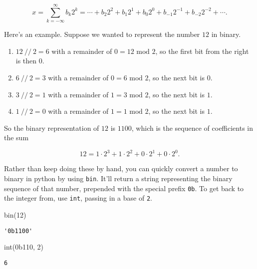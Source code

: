 \documentclass[
  letterpaper,
  DIV=11,
  numbers=noendperiod]{scrreprt}
\newenvironment{Shaded}{\begin{snugshade}}{\end{snugshade}}
\newcommand{\BuiltInTok}[1]{\textcolor[rgb]{0.00,0.23,0.31}{#1}}
\newcommand{\DecValTok}[1]{\textcolor[rgb]{0.68,0.00,0.00}{#1}}
\newcommand{\NormalTok}[1]{\textcolor[rgb]{0.00,0.23,0.31}{#1}}
\newcommand{\StringTok}[1]{\textcolor[rgb]{0.13,0.47,0.30}{#1}}
\providecommand{\tightlist}{%
  \setlength{\itemsep}{0pt}\setlength{\parskip}{0pt}}\usepackage{longtable,booktabs,array}
\begin{document}
\[x = \sum_{k=-\infty}^\infty b_k 2^k = \cdots + b_2 2^2 + b_1 2^1 + b_0 2^0 + b_{-1} 2^{-1} + b_{-2} 2^{-2} + \cdots.\]

Here's an example. Suppose we wanted to represent the number \(12\) in
binary.

\begin{enumerate}
\def\labelenumi{\arabic{enumi}.}
\tightlist
\item
  \(12 \ // \ 2 = 6\) with a remainder of \(0 = 12 \text{ mod } 2\), so
  the first bit from the right is then \(0\).
\item
  \(6 \ // \ 2 = 3\) with a remainder of \(0 = 6 \text{ mod } 2\), so
  the next bit is \(0\).
\item
  \(3 \ // \ 2 = 1\) with a remainder of \(1 = 3 \text{ mod } 2\), so
  the next bit is \(1\).
\item
  \(1 \ // \ 2 = 0\) with a remainder of \(1 = 1 \text{ mod } 2\), so
  the next bit is \(1\).
\end{enumerate}

So the binary representation of \(12\) is \(1100\), which is the
sequence of coefficients in the sum

\[12 = 1 \cdot 2^{3} + 1 \cdot 2^{2} + 0 \cdot 2^{1} + 0 \cdot 2^{0}.\]

Rather than keep doing these by hand, you can quickly convert a number
to binary in python by using \texttt{bin}. It'll return a string
representing the binary sequence of that number, prepended with the
special prefix \texttt{0b}. To get back to the integer from, use
\texttt{int}, passing in a base of \texttt{2}.

\begin{Shaded}
\begin{Highlighting}[]
\BuiltInTok{bin}\NormalTok{(}\DecValTok{12}\NormalTok{)}
\end{Highlighting}
\end{Shaded}

\begin{verbatim}
'0b1100'
\end{verbatim}

\begin{Shaded}
\begin{Highlighting}[]
\BuiltInTok{int}\NormalTok{(}\StringTok{\textquotesingle{}0b110\textquotesingle{}}\NormalTok{, }\DecValTok{2}\NormalTok{)}
\end{Highlighting}
\end{Shaded}

\begin{verbatim}
6
\end{verbatim}
\end{document}
